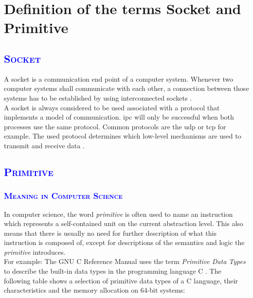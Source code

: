 \documentclass[xcolor=dvipsnames]{article}
\begin{document}
\section{Definition of the terms Socket and Primitive}

\subsection{\scshape{\textcolor{blue}{Socket}}}\label{introduction_socket}

A socket is a communication end point of a computer system. Whenever two computer systems shall communicate with each other, a connection between those systems has to be established by using interconnected sockets \cite[p. 553, ch. 6.5.2]{computer_networks}.\\

\noindent A socket is always considered to be used associated with a protocol that implements a model of communication. \gls{ipc} will only be successful when both processes use the same protocol. Common protocols are the \gls{udp} or \gls{tcp} for example. The used protocol determines which low-level mechanisms are used to transmit and receive data \cite[p. 427 - 427, ch. 16]{GNU_C_library_manual}.

\subsection{\scshape{\textcolor{blue}{Primitive}}}

\subsubsection{\scshape{\textcolor{blue}{Meaning in Computer Science}}}

In computer science, the word \textit{primitive} is often used to name an instruction which represents a self-contained unit on the current abstraction level. This also means that there is usually no need for further description of what this instruction is composed of, except for descriptions of the semantics and logic the \textit{primitive} introduces.\\

\noindent For example: The GNU C Reference Manual uses the term \textit{Primitive Data Types} to describe the built-in data types in the programming language C \cite[p. 8, ch. 2]{GNU_C_manual}. The following table shows a selection of primitive data types of a C language, their characteristics and the memory allocation on 64-bit systems:\\
\end{document}
